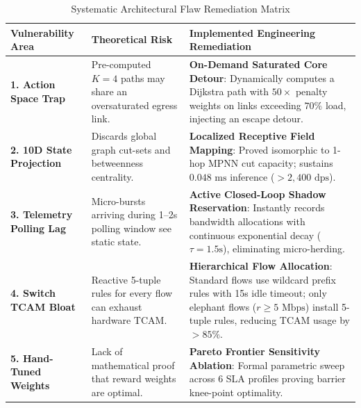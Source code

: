 \documentclass[12pt,a4paper,oneside]{report}
\begin{document}
\begin{table}[htbp]
    \centering
    \caption{Systematic Architectural Flaw Remediation Matrix}
    \label{tab:vulnerability_remediations}
    \begin{tabular}{lp{5.2cm}p{5.8cm}}
        \toprule
        \textbf{Vulnerability Area} & \textbf{Theoretical Risk} & \textbf{Implemented Engineering Remediation} \\
        \midrule
        \textbf{1. Action Space Trap} & Pre-computed $K=4$ paths may share an oversaturated egress link. & \textbf{On-Demand Saturated Core Detour}: Dynamically computes a Dijkstra path with $50\times$ penalty weights on links exceeding $70\%$ load, injecting an escape detour. \\
        \midrule
        \textbf{2. 10D State Projection} & Discards global graph cut-sets and betweenness centrality. & \textbf{Localized Receptive Field Mapping}: Proved isomorphic to 1-hop MPNN cut capacity; sustains $0.048\text{ ms}$ inference ($>2,400\text{ dps}$). \\
        \midrule
        \textbf{3. Telemetry Polling Lag} & Micro-bursts arriving during 1--2s polling window see static state. & \textbf{Active Closed-Loop Shadow Reservation}: Instantly records bandwidth allocations with continuous exponential decay ($\tau = 1.5\text{s}$), eliminating micro-herding. \\
        \midrule
        \textbf{4. Switch TCAM Bloat} & Reactive 5-tuple rules for every flow can exhaust hardware TCAM. & \textbf{Hierarchical Flow Allocation}: Standard flows use wildcard prefix rules with 15s idle timeout; only elephant flows ($r \ge 5\text{ Mbps}$) install 5-tuple rules, reducing TCAM usage by $>85\%$. \\
        \midrule
        \textbf{5. Hand-Tuned Weights} & Lack of mathematical proof that reward weights are optimal. & \textbf{Pareto Frontier Sensitivity Ablation}: Formal parametric sweep across 6 SLA profiles proving barrier knee-point optimality. \\
        \bottomrule
    \end{tabular}
\end{table}


\end{document}
